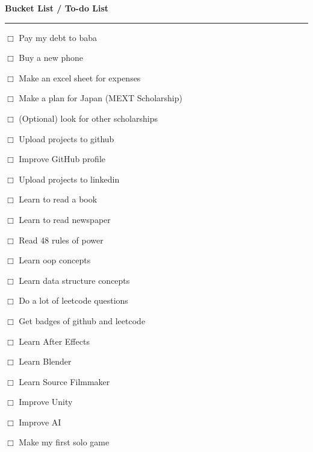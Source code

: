 \documentclass[a4paper]{article}
\begin{document}
\begin{center}
    {\Huge \bfseries Bucket List / To-do List}
    
    \vspace{0.5cm}
    \noindent\rule{\textwidth}{1pt}
\end{center}

\vspace{1cm}

\huge

$\Box$ Pay my debt to baba \par \vfill
$\Box$ Buy a new phone \par \vfill
$\Box$ Make an excel sheet for expenses \par \vfill
$\Box$ Make a plan for Japan (MEXT Scholarship) \par \vfill
$\Box$ (Optional) look for other scholarships \par \vfill
$\Box$ Upload projects to github \par \vfill
$\Box$ Improve GitHub profile \par \vfill
$\Box$ Upload projects to linkedin \par \vfill
$\Box$ Learn to read a book \par \vfill
$\Box$ Learn to read newspaper \par \vfill
$\Box$ Read 48 rules of power \par \vfill
$\Box$ Learn oop concepts \par \vfill
$\Box$ Learn data structure concepts \par \vfill
$\Box$ Do a lot of leetcode questions \par \vfill
$\Box$ Get badges of github and leetcode \par \vfill
$\Box$ Learn After Effects \par \vfill
$\Box$ Learn Blender \par \vfill
$\Box$ Learn Source Filmmaker \par \vfill
$\Box$ Improve Unity \par \vfill
$\Box$ Improve AI \par \vfill
$\Box$ Make my first solo game \par %
\end{document}
